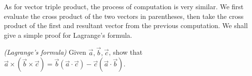 As for vector triple product, the process of computation is very similar. We first evaluate the cross product of the two vectors in parentheses, then take the cross product of the first and resultant vector from the previous computation. We shall give a simple proof for Lagrange's formula.
\begin{theorem}
  \textit{(Lagrange's formula)} Given \(\vec{a}, \vec{b}, \vec{c}\), show that \(\vec{a}\times(\vec{b}\times\vec{c}) = \vec{b}(\vec{a}\cdot\vec{c})-\vec{c}(\vec{a}\cdot\vec{b})\). \footnotemark
\end{theorem}

